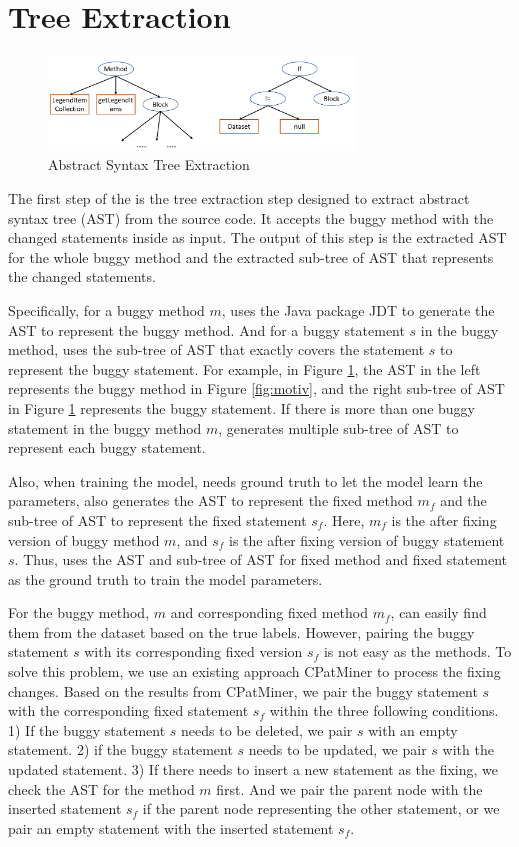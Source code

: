 \section{Tree Extraction}

\begin{figure}[t]
	\centering
	\includegraphics[width=3.2in]{graphs/tree_extraction.png}
	\caption{Abstract Syntax Tree Extraction}
	\label{tree-extraction}
\end{figure}


The first step of the \tool is the tree extraction step designed to extract abstract syntax tree (AST) from the source code. It accepts the buggy method with the changed statements inside as input. The output of this step is the extracted AST for the whole buggy method and the extracted sub-tree of AST that represents the changed statements.

Specifically, for a buggy method $m$, \tool uses the Java package JDT \cite{JDT} to generate the AST to represent the buggy method. And for a buggy statement $s$ in the buggy method, \tool uses the sub-tree of AST that exactly covers the statement $s$ to represent the buggy statement. For example, in Figure \ref{tree-extraction}, the AST in the left represents the buggy method in Figure \ref{fig:motiv}, and the right sub-tree of AST in Figure \ref{tree-extraction} represents the buggy statement. If there is more than one buggy statement in the buggy method $m$, \tool generates multiple sub-tree of AST to represent each buggy statement.

Also, when training the model, \tool needs ground truth to let the model learn the parameters, \tool also generates the AST to represent the fixed method $m_f$ and the sub-tree of AST to represent the fixed statement $s_f$. Here, $m_f$ is the after fixing version of buggy method $m$, and $s_f$ is the after fixing version of buggy statement $s$. Thus, \tool uses the AST and sub-tree of AST for fixed method and fixed statement as the ground truth to train the model parameters.

For the buggy method, $m$ and corresponding fixed method $m_f$, \tool can easily find them from the dataset based on the true labels. However, pairing the buggy statement $s$ with its corresponding fixed version $s_f$ is not easy as the methods. To solve this problem, we use an existing approach CPatMiner \cite{nguyen2019graph} to process the fixing changes. Based on the results from CPatMiner, we pair the buggy statement $s$ with the corresponding fixed statement $s_f$ within the three following conditions. 1) If the buggy statement $s$ needs to be deleted, we pair $s$ with an empty statement. 2) if the buggy statement $s$ needs to be updated, we pair $s$ with the updated statement. 3) If there needs to insert a new statement as the fixing, we check the AST for the method $m$ first. And we pair the parent node with the inserted statement $s_f$ if the parent node representing the other statement, or we pair an empty statement with the inserted statement $s_f$. 